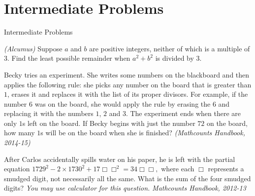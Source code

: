 \documentclass[9pt]{beamer}
\begin{document}
\section{Intermediate Problems}
\begin{frame}
    \begin{alertblock}{}
        \begin{flushright}
        {\huge Intermediate Problems}
        \end{flushright}
    \end{alertblock}
\end{frame}

\begin{frame}[t]{8.1}
    \begin{block}{}
        \textit{(Alcumus)} Suppose $a$ and $b$ are positive integers, neither of which is a multiple of 3. Find the least possible remainder when $a^2 + b^2$ is divided by 3.
        
    \end{block}
    \end{frame}
    
    
     
     \begin{frame}[t]{8.2}
    \begin{block}{}
        Becky tries an experiment. She writes some numbers on the blackboard and then applies the following rule: she picks any number on the board that is greater than $1$, erases it and replaces it with the list of its proper divisors. For example, if the number $6$ was on the board, she would apply the rule by erasing the $6$ and replacing it with the numbers $1$, $2$ and $3.$ The experiment ends when there are only $1$s left on the board. If Becky begins with just the number $72$ on the board, how many $1$s will be on the board when she is finished? \textit{(Mathcounts Handbook, 2014-15)}
        
    \end{block}
    \end{frame}
    \begin{frame}[t]{8.3}
    \begin{block}{}
        After Carlos accidentally spills water on his paper, he is left with the partial equation $1729^2 - 2 \times 1730^2 + 17\Box\Box^2 = 34\Box\Box,$ where each $\Box$ represents a smudged digit, not necessarily all the same. What is the sum of the four smudged digits? \textit{You may use calculator for this question.} \textit{Mathcounts Handbook, 2012-13}
        
    \end{block}
    \end{frame}
     
\end{document}
